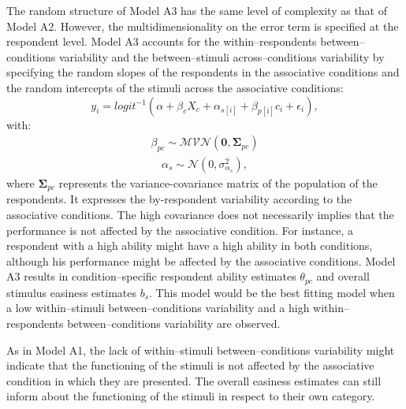 \documentclass[12pt]{book}
\begin{document}
The random structure of Model A3 has the same level of complexity as that of Model A2. However, the multidimensionality on the error term is specified at the respondent level. 
Model A3 accounts for the within--respondents between--conditions variability and the between--stimuli across--conditions variability by specifying the random slopes of the respondents in the associative conditions and the random intercepts of the stimuli across the associative conditions: 
%
\begin{equation}\label{Accuracy1}
	y_{i} = logit^{-1}(\alpha + \beta_cX_c + \alpha_{s[i]} +  \beta_{p[i]}c_{i} + \epsilon_{i}),
\end{equation}
with:
\begin{align}
	\beta_{pc} \sim \mathcal{MVN}(\bm{0}, \bm{\Sigma}_{pc})
\end{align}
\begin{align}
	\alpha_s \sim \mathcal{N} (0, \sigma_{\alpha_s}^2),
\end{align}
where $\bm{\Sigma}_{pc}$ represents the variance-covariance matrix of the population of the respondents. It expresses the by-respondent variability according to the associative conditions. The high covariance does not necessarily implies that the performance is not affected by the associative condition. For instance, a respondent with a high ability might have a high ability in both conditions, although his performance might be affected by the associative conditions.
Model A3 results in condition--specific respondent ability estimates $\theta_{pc}$ and overall stimulus easiness estimates $b_s$. This model would be the best fitting model when a low within--stimuli between--conditions variability and a high within--respondents between--conditions variability are observed.

As in Model A1, the lack of within--stimuli between--conditions variability might indicate that the functioning of the stimuli is not affected by the associative condition in which they are presented. The overall easiness estimates can still inform about the functioning of the stimuli in respect to their own category. 
\end{document}
